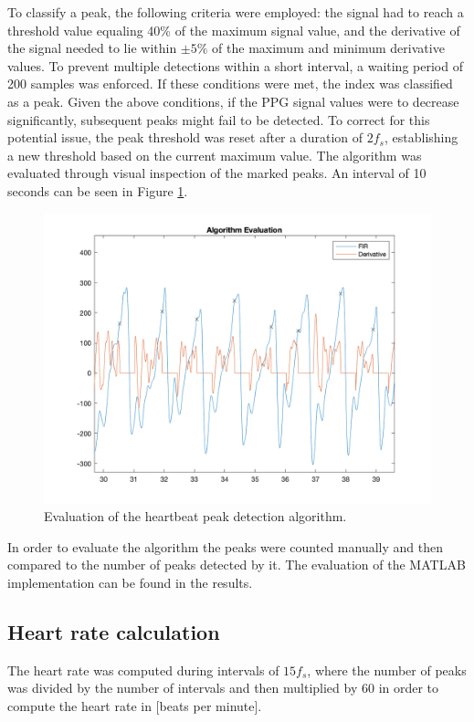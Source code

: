 To classify a peak, the following criteria were employed: the signal had to reach a threshold value equaling 40\% of the maximum signal value, and the derivative of the signal needed to lie within $\pm5\%$ of the maximum and minimum derivative values. To prevent multiple detections within a short interval, a waiting period of 200 samples was enforced. If these conditions were met, the index was classified as a peak. Given the above conditions, if the PPG signal values were to decrease significantly, subsequent peaks might fail to be detected. To correct for this potential issue, the peak threshold was reset after a duration of $2f_s$, establishing a new threshold based on the current maximum value. The algorithm was evaluated through visual inspection of the marked peaks. An interval of 10 seconds can be seen in Figure \ref{fig:peaks}.
\begin{figure}
\centering
	\includegraphics[width=\linewidth, trim={2.5cm, 1cm, 2cm, 1cm}, clip]{Figures/peaks.png}
	\caption{Evaluation of the heartbeat peak detection algorithm.}
	\label{fig:peaks}
\end{figure}
In order to evaluate the algorithm the peaks were counted manually and then compared to the number of peaks detected by it. The evaluation of the MATLAB implementation can be found in the results.

\subsection{Heart rate calculation}
The heart rate was computed during intervals of $15f_s$, where the number of peaks was divided by the number of intervals and then multiplied by $60$ in order to compute the heart rate in [beats per minute].

